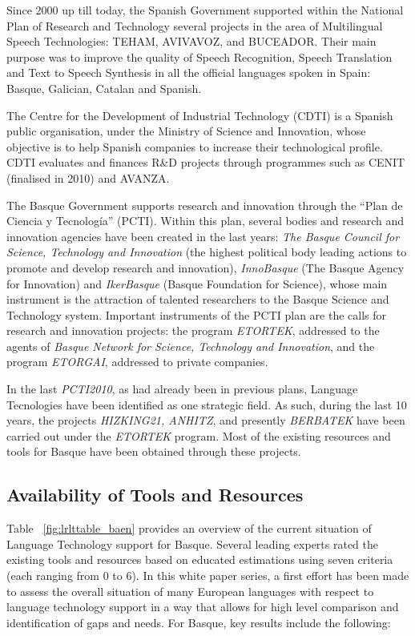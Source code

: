 \begin{multicols}{2}
Since 2000 up till today, the Spanish Government supported within the National Plan of Research and Technology several projects in the area of Multilingual Speech Technologies: TEHAM, AVIVAVOZ, and BUCEADOR. Their main purpose was to improve the quality of Speech Recognition, Speech Translation and Text to Speech Synthesis in all the official languages spoken in Spain: Basque, Galician, Catalan and Spanish.

The Centre for the Development of Industrial Technology (CDTI) is a Spanish public organisation, under the Ministry of Science and Innovation, whose objective is to help Spanish companies to increase their technological profile. CDTI evaluates and finances R\&D projects through programmes such as CENIT (finalised in 2010) and AVANZA.

The Basque Government supports research and innovation through the “Plan de Ciencia y Tecnología” (PCTI). Within this plan, several bodies and research and innovation agencies have been created in the last years: \textit{The Basque Council for Science, Technology and Innovation} (the highest political body leading actions to promote and develop research and innovation), \textit{InnoBasque} (The Basque Agency for Innovation) and \textit{IkerBasque} (Basque Foundation for Science), whose main instrument is the attraction of talented researchers to the Basque Science and Technology system.  Important instruments of the PCTI plan are the calls for research and innovation projects: the program \textit{ETORTEK}, addressed to the agents of\textit{ Basque Network for Science, Technology and Innovation}, and the program \textit{ETORGAI}, addressed to private companies. 

In the last \textit{PCTI2010}, as had already been in previous plans, Language Tecnologies have been identified as one strategic field. As such, during the last 10 years, the projects \textit{HIZKING21, ANHITZ}, and presently \textit{BERBATEK} \cite{BAS-Nota37}  have been carried out under the \textit{ETORTEK} program. Most of the existing resources and tools for Basque have been obtained through these projects.
  
\subsection{Availability of Tools and Resources}

    Table ~\ref{fig:lrlttable_baen} provides an overview of the current situation of Language Technology support for Basque. Several leading experts rated the existing tools and resources based on educated estimations using seven criteria (each ranging from 0 to 6).
    In this white paper series, a first effort has been made to assess the overall situation of many European languages with respect to language technology support in a way that allows for high level comparison and identification of gaps and needs.
For Basque, key results 
include the following:


\end{multicols}
